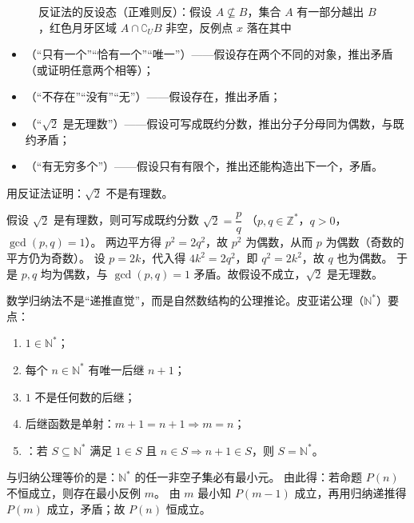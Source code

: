 \begin{explore}
\begin{figure}[htbp]
  \caption{反证法的反设态（正难则反）：假设 $A\not\subseteq B$，集合 $A$ 有一部分越出 $B$，红色月牙区域 $A\cap\complement_U B$ 非空，反例点 $x$ 落在其中}
  \label{fig:contradiction-assumption}
\end{figure}

\begin{itemize}
  \item {}（“只有一个”“恰有一个”“唯一”）——假设存在两个不同的对象，推出矛盾（或证明任意两个相等）；
  \item {}（“不存在”“没有”“无”）——假设存在，推出矛盾；
  \item {}（“$\sqrt2$ 是无理数”）——假设可写成既约分数，推出分子分母同为偶数，与既约矛盾；
  \item {}（“有无穷多个”）——假设只有有限个，推出还能构造出下一个，矛盾。
\end{itemize}

\begin{example}
用反证法证明：$\sqrt2$ 不是有理数。
\end{example}
\begin{solution}
假设 $\sqrt2$ 是有理数，则可写成既约分数 $\sqrt2=\dfrac pq$
（$p,q\in\mathbb{Z}^*$，$q>0$，$\gcd(p,q)=1$）。
两边平方得 $p^2=2q^2$，故 $p^2$ 为偶数，从而 $p$ 为偶数（奇数的平方仍为奇数）。
设 $p=2k$，代入得 $4k^2=2q^2$，即 $q^2=2k^2$，故 $q$ 也为偶数。
于是 $p,q$ 均为偶数，与 $\gcd(p,q)=1$ 矛盾。故假设不成立，$\sqrt2$ 是无理数。
\end{solution}

数学归纳法不是“递推直觉”，而是自然数结构的公理推论。皮亚诺公理（$\mathbb{N}^*$）要点：
\begin{enumerate}
  \item $1\in\mathbb{N}^*$；
  \item 每个 $n\in\mathbb{N}^*$ 有唯一后继 $n+1$；
  \item $1$ 不是任何数的后继；
  \item 后继函数是单射：$m+1=n+1\Rightarrow m=n$；
  \item {}：若 $S\subseteq\mathbb{N}^*$ 满足 $1\in S$ 且 $n\in S\Rightarrow n+1\in S$，则 $S=\mathbb{N}^*$。
\end{enumerate}
与归纳公理等价的是：$\mathbb{N}^*$ 的任一非空子集必有最小元。
由此得：若命题 $P(n)$ 不恒成立，则存在最小反例 $m$。
由 $m$ 最小知 $P(m-1)$ 成立，再用归纳递推得 $P(m)$ 成立，矛盾；故 $P(n)$ 恒成立。


\end{explore}
